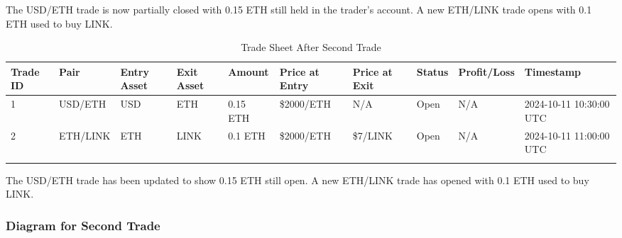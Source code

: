 \documentclass{article}
\begin{document}
The USD/ETH trade is now partially closed with 0.15 ETH still held in the trader's account. A new ETH/LINK trade opens with 0.1 ETH used to buy LINK.

\begin{center}
  \scriptsize %
  \begin{longtable}{|p{0.8cm}|p{1.2cm}|p{1.5cm}|p{1.5cm}|p{1cm}|p{1.5cm}|p{1.5cm}|p{1cm}|p{1.5cm}|p{1.5cm}|}
    \hline
    \textbf{Trade ID} & \textbf{Pair} & \textbf{Entry Asset} & \textbf{Exit Asset} & \textbf{Amount} & \textbf{Price at Entry} & \textbf{Price at Exit} & \textbf{Status} & \textbf{Profit/Loss} & \textbf{Timestamp} \\
    \hline
    1 & USD/ETH & USD & ETH & 0.15 ETH & \$2000/ETH & N/A & Open & N/A & 2024-10-11 10:30:00 UTC \\
    \hline
    2 & ETH/LINK & ETH & LINK & 0.1 ETH & \$2000/ETH & \$7/LINK & Open & N/A & 2024-10-11 11:00:00 UTC \\
    \hline
    \caption{Trade Sheet After Second Trade}
    \end{longtable}
    \end{center}

The USD/ETH trade has been updated to show 0.15 ETH still open. A new ETH/LINK trade has opened with 0.1 ETH used to buy LINK.

\subsubsection*{Diagram for Second Trade}


\newpage
\end{document}
